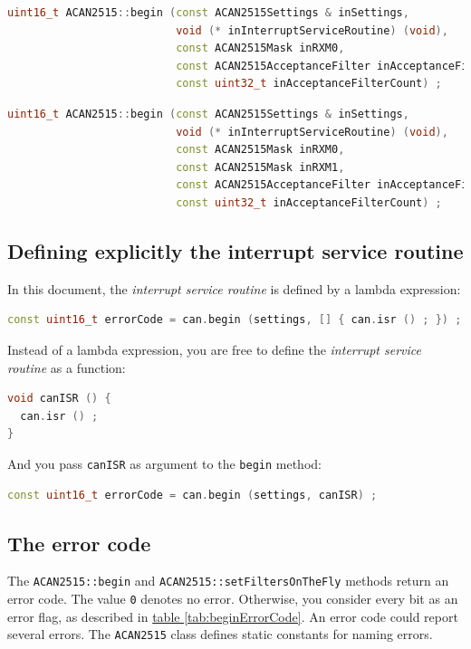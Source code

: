 \documentclass[10pt, a4paper, obeyspaces]{extarticle}
\newcommand \subsectionLabel[2]{\subsection{#1}\label{subsec:#2}}
\newcommand\refTableau[1]{\hyperref[tab:#1]{table \ref*{tab:#1}}}
\begin{document}
{ \small\begin{lstlisting}[language=c++]
uint16_t ACAN2515::begin (const ACAN2515Settings & inSettings,
                          void (* inInterruptServiceRoutine) (void),
                          const ACAN2515Mask inRXM0,
                          const ACAN2515AcceptanceFilter inAcceptanceFilters [],
                          const uint32_t inAcceptanceFilterCount) ;
\end{lstlisting}}

{ \small\begin{lstlisting}[language=c++]
uint16_t ACAN2515::begin (const ACAN2515Settings & inSettings,
                          void (* inInterruptServiceRoutine) (void),
                          const ACAN2515Mask inRXM0,
                          const ACAN2515Mask inRXM1,
                          const ACAN2515AcceptanceFilter inAcceptanceFilters [],
                          const uint32_t inAcceptanceFilterCount) ;
\end{lstlisting}}



\subsectionLabel{Defining explicitly the interrupt service routine}{isrExplicit}

In this document, the \emph{interrupt service routine} is defined by a lambda expression:
{ \small\begin{lstlisting}[language=c++]
  const uint16_t errorCode = can.begin (settings, [] { can.isr () ; }) ;
\end{lstlisting}}

Instead of a lambda expression, you are free to define the \emph{interrupt service routine} as a function:
{ \small\begin{lstlisting}[language=c++]
void canISR () {
  can.isr () ;
}
\end{lstlisting}}

And you pass \texttt{canISR} as argument to the \texttt{begin} method:
{ \small\begin{lstlisting}[language=c++]
  const uint16_t errorCode = can.begin (settings, canISR) ;
\end{lstlisting}}


\subsectionLabel{The error code}{errorCodeMethodBegin}

The \texttt{ACAN2515::begin} and \texttt{ACAN2515::setFiltersOnTheFly} methods return an error code. The value \texttt{0} denotes no error. Otherwise, you consider every bit as an error flag, as described in \refTableau{beginErrorCode}. An error code could report several errors. The \texttt{ACAN2515} class defines static constants for naming errors.
\end{document}
